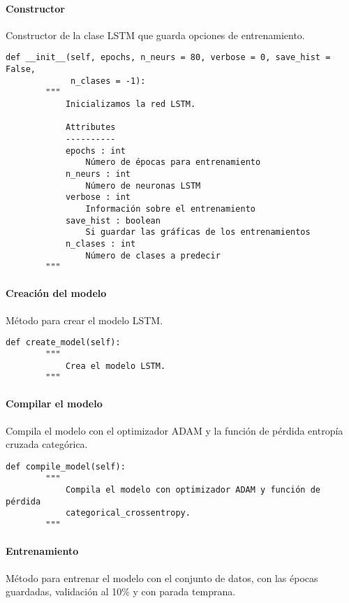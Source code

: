 \paragraph{Constructor}

Constructor de la clase LSTM que guarda opciones de entrenamiento.

\begin{lstlisting}
def __init__(self, epochs, n_neurs = 80, verbose = 0, save_hist = False,
             n_clases = -1):
        """
            Inicializamos la red LSTM.

            Attributes
            ----------
            epochs : int
                Número de épocas para entrenamiento
            n_neurs : int
                Número de neuronas LSTM
            verbose : int
                Información sobre el entrenamiento
            save_hist : boolean
                Si guardar las gráficas de los entrenamientos
            n_clases : int
                Número de clases a predecir
        """
\end{lstlisting}

\paragraph{Creación del modelo}

Método para crear el modelo LSTM.

\begin{lstlisting}
def create_model(self):
        """
            Crea el modelo LSTM.
        """
\end{lstlisting}

\paragraph{Compilar el modelo}

Compila el modelo con el optimizador ADAM y la función de pérdida entropía cruzada categórica.

\begin{lstlisting}
def compile_model(self):
        """
            Compila el modelo con optimizador ADAM y función de pérdida
            categorical_crossentropy.
        """
\end{lstlisting}

\paragraph{Entrenamiento}

Método para entrenar el modelo con el conjunto de datos, con las épocas guardadas, validación al 10\% y con parada temprana.

